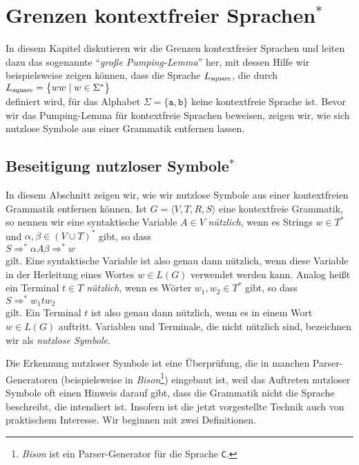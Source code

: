 \chapter{Grenzen kontextfreier Sprachen$^*$} 
In diesem Kapitel diskutieren wir die Grenzen kontextfreier Sprachen und leiten dazu das
sogenannte ``\emph{gro{\ss}e Pumping-Lemma}'' her, mit dessen Hilfe wir beispielsweise zeigen
k\"onnen, dass die Sprache $L_{\mbox{\scriptsize \textsl{square}}}$, die durch
\\[0.2cm]
\hspace*{1.3cm} $L_{\mbox{\scriptsize \textsl{square}}} = \bigl\{ ww \mid w \in \Sigma^*\bigr\}$
\\[0.2cm]
definiert wird, f\"ur das Alphabet $\Sigma =\{\texttt{a}, \texttt{b}\}$ keine kontextfreie Sprache
ist.  Bevor wir das Pumping-Lemma f\"ur kontextfreie Sprachen beweisen, zeigen wir, wie sich nutzlose
Symbole aus einer Grammatik entfernen lassen. 

\section{Beseitigung nutzloser Symbole$^*$}
In diesem Abschnitt zeigen wir, wie wir nutzlose Symbole aus einer kontextfreien Grammatik entfernen
k\"onnen. Ist $G = \langle V, T, R, S \rangle$ eine kontextfreie Grammatik, so nennen wir
eine syntaktische Variable $A \in V$ \emph{n\"utzlich}, wenn es Strings $w \in T^*$ und
$\alpha,\beta \in (V \cup T)^*$ gibt, so dass  
\\[0.2cm]
\hspace*{1.3cm}
$S \Rightarrow^* \alpha A \beta \Rightarrow^* w$
\\[0.2cm]
gilt.  Eine syntaktische Variable ist also genau dann n\"utzlich, wenn diese Variable in der Herleitung
eines Wortes $w \in L(G)$ verwendet werden kann.  Analog hei{\ss}t
ein Terminal $t \in T$ \emph{n\"utzlich}, wenn es W\"orter $w_1, w_2 \in T^*$ gibt, so dass
\\[0.2cm]
\hspace*{1.3cm}
$S \Rightarrow^* w_1 t w_2$
\\[0.2cm]
gilt.  Ein Terminal $t$ ist also genau dann n\"utzlich, wenn es in einem Wort  $w \in L(G)$
auftritt.  Variablen und Terminale, die nicht n\"utzlich sind, bezeichnen wir als
\emph{nutzlose Symbole}.

Die Erkennung nutzloser Symbole ist eine \"Uberpr\"ufung, die in manchen Parser-Generatoren
(beispielsweise in \textsl{Bison}\footnote{
\textsl{Bison} ist ein Parser-Generator f\"ur die Sprache \texttt{C}.}) 
eingebaut ist, weil das Auftreten nutzloser Symbole oft
einen Hinweis darauf gibt, dass die Grammatik nicht die Sprache beschreibt, die intendiert ist.  
Insofern ist die jetzt vorgestellte Technik auch von praktischem Interesse.
Wir beginnen mit zwei Definitionen.

